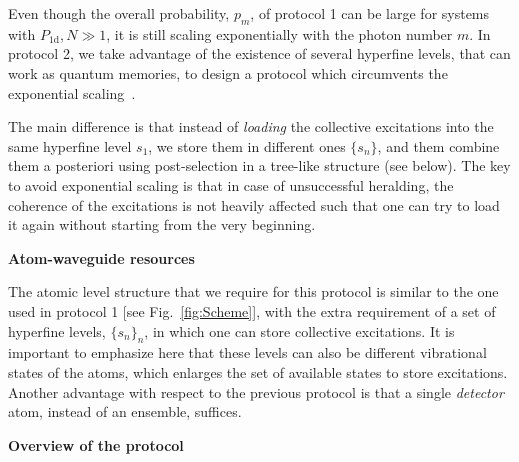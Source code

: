 \documentclass[twocolumn,pra,aps,superscriptaddress,showpacs]{revtex4-1}
\def\oned{\mathrm{1d}}
\begin{document}
Even though the overall probability, $p_m$, of protocol 1 can be large for systems with $P_\oned,N\gg 1$, it is still scaling exponentially with the photon number $m$. In protocol 2, we take advantage of the existence of several hyperfine levels, that can work as quantum memories, to design a protocol which circumvents the exponential scaling~\cite{gonzaleztudela17a,fiurasek05a}.

The main difference is that instead of \emph{loading} the collective excitations into the same hyperfine level $s_1$, we store them in different ones $\{s_n\}$, and them combine them a posteriori using post-selection in a tree-like structure (see below). The key to avoid exponential scaling is that in case of unsuccessful heralding, the coherence of the excitations is not heavily affected such that one can try to load it again without starting from the very beginning.

\textbf{Atom-waveguide resources}

The atomic level structure that we require for this protocol is similar to the one used in protocol 1 [see Fig.~\ref{fig:Scheme}], with the extra requirement of a set of hyperfine levels, $\{s_n\}_n$, in which one can store collective excitations. It is important to emphasize here that these levels can also be different vibrational states of the atoms, which enlarges the set of available states to store excitations. Another advantage with respect to the previous protocol is that a single \emph{detector} atom, instead of an ensemble, suffices.
 
\textbf{Overview of the protocol}
\end{document}
